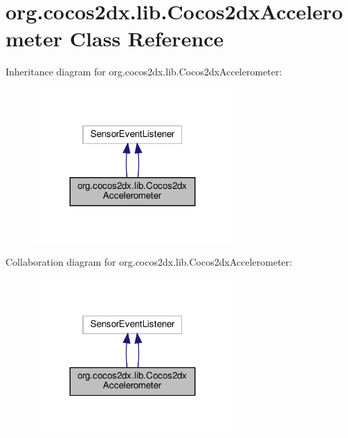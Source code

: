 \hypertarget{classorg_1_1cocos2dx_1_1lib_1_1Cocos2dxAccelerometer}{}\section{org.\+cocos2dx.\+lib.\+Cocos2dx\+Accelerometer Class Reference}
\label{classorg_1_1cocos2dx_1_1lib_1_1Cocos2dxAccelerometer}


Inheritance diagram for org.\+cocos2dx.\+lib.\+Cocos2dx\+Accelerometer\+:
\nopagebreak
\begin{figure}[H]
\begin{center}
\leavevmode
\includegraphics[width=215pt]{classorg_1_1cocos2dx_1_1lib_1_1Cocos2dxAccelerometer__inherit__graph}
\end{center}
\end{figure}


Collaboration diagram for org.\+cocos2dx.\+lib.\+Cocos2dx\+Accelerometer\+:
\nopagebreak
\begin{figure}[H]
\begin{center}
\leavevmode
\includegraphics[width=215pt]{classorg_1_1cocos2dx_1_1lib_1_1Cocos2dxAccelerometer__coll__graph}
\end{center}
\end{figure}
